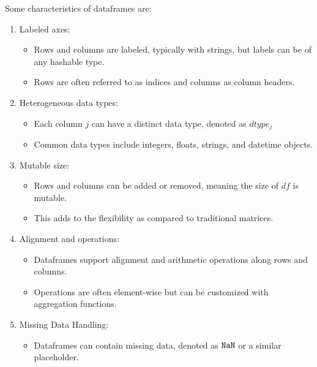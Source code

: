 \documentclass[11pt, reqno]{amsart}
\theoremstyle{definition}
\theoremstyle{remark}
\newcommand{\NaN}{\textnormal{\texttt{NaN}}}
\begin{document}
  Some characteristics of dataframes are:
  \begin{enumerate}
    \item Labeled axes:
      \begin{itemize}
        \item Rows and columns are labeled, typically with strings, but labels can
          be of any hashable type.

        \item Rows are often referred to as indices and columns as column headers.
      \end{itemize}

    \item Heterogeneous data types:
      \begin{itemize}
        \item Each column $j$ can have a distinct data type, denoted as
          $dtype_{j}$

        \item Common data types include integers, floats, strings, and datetime
          objects.
      \end{itemize}

    \item Mutable size:
      \begin{itemize}
        \item Rows and columns can be added or removed, meaning the size of $df$
          is mutable.

        \item This adds to the flexibility as compared to traditional matrices.
      \end{itemize}

    \item Alignment and operations:
      \begin{itemize}
        \item Dataframes support alignment and arithmetic operations along rows and
          columns.

        \item Operations are often element-wise but can be customized with aggregation
          functions.
      \end{itemize}

    \item Missing Data Handling:
      \begin{itemize}
        \item Dataframes can contain missing data, denoted as $\NaN$ or a
          similar placeholder.


\end{itemize}
\end{enumerate}
\end{document}
